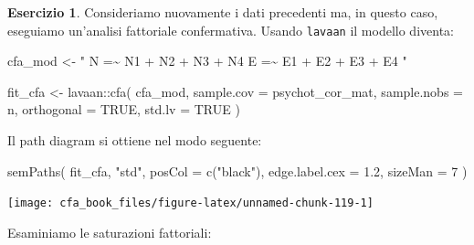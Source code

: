 \documentclass[
  11pt,
]{krantz}
\makeatletter
\newenvironment{Shaded}{\begin{snugshade}}{\end{snugshade}}
\newcommand{\AttributeTok}[1]{\textcolor[rgb]{0.61,0.61,0.61}{#1}}
\newcommand{\ConstantTok}[1]{\textcolor[rgb]{0,0,0}{#1}}
\newcommand{\DecValTok}[1]{\textcolor[rgb]{0.06,0.06,0.06}{#1}}
\newcommand{\FloatTok}[1]{\textcolor[rgb]{0.06,0.06,0.06}{#1}}
\newcommand{\FunctionTok}[1]{\textcolor[rgb]{0,0,0}{#1}}
\newcommand{\NormalTok}[1]{#1}
\newcommand{\OtherTok}[1]{\textcolor[rgb]{0.37,0.37,0.37}{#1}}
\newcommand{\SpecialCharTok}[1]{\textcolor[rgb]{0,0,0}{#1}}
\newcommand{\StringTok}[1]{\textcolor[rgb]{0.5,0.5,0.5}{#1}}
\newenvironment{kframe}{%
\medskip{}
\setlength{\fboxsep}{.8em}
 \def\at@end@of@kframe{}%
 \ifinner\ifhmode%
  \def\at@end@of@kframe{\end{minipage}}%
  \begin{minipage}{\columnwidth}%
 \fi\fi%
 \def\FrameCommand##1{\hskip\@totalleftmargin \hskip-\fboxsep
 \colorbox{shadecolor}{##1}\hskip-\fboxsep
     \hskip-\linewidth \hskip-\@totalleftmargin \hskip\columnwidth}%
 \MakeFramed {\advance\hsize-\width
   \@totalleftmargin\z@ \linewidth\hsize
   \@setminipage}}%
 {\par\unskip\endMakeFramed%
 \at@end@of@kframe}
\renewenvironment{Shaded}{\begin{kframe}}{\end{kframe}}
\theoremstyle{definition}
\theoremstyle{definition}
\theoremstyle{definition}
\newtheorem{exercise}{Esercizio}[chapter]
\theoremstyle{definition}
\theoremstyle{remark}
\makeatother
\begin{document}
\begin{exercise}
Consideriamo nuovamente i dati precedenti ma, in questo caso, eseguiamo un'analisi fattoriale confermativa. Usando \texttt{lavaan} il modello diventa:

\begin{Shaded}
\begin{Highlighting}[]
\NormalTok{cfa\_mod }\OtherTok{\textless{}{-}} \StringTok{"}
\StringTok{  N =\textasciitilde{} N1 + N2 + N3 + N4}
\StringTok{  E =\textasciitilde{} E1 + E2 + E3 + E4}
\StringTok{"}
\end{Highlighting}
\end{Shaded}

\begin{Shaded}
\begin{Highlighting}[]
\NormalTok{fit\_cfa }\OtherTok{\textless{}{-}}\NormalTok{ lavaan}\SpecialCharTok{::}\FunctionTok{cfa}\NormalTok{(}
\NormalTok{  cfa\_mod,}
  \AttributeTok{sample.cov =}\NormalTok{ psychot\_cor\_mat,}
  \AttributeTok{sample.nobs =}\NormalTok{ n,}
  \AttributeTok{orthogonal =} \ConstantTok{TRUE}\NormalTok{,}
  \AttributeTok{std.lv =} \ConstantTok{TRUE}
\NormalTok{)}
\end{Highlighting}
\end{Shaded}

Il path diagram si ottiene nel modo seguente:

\begin{Shaded}
\begin{Highlighting}[]
\FunctionTok{semPaths}\NormalTok{(}
\NormalTok{  fit\_cfa,}
  \StringTok{"std"}\NormalTok{,}
  \AttributeTok{posCol =} \FunctionTok{c}\NormalTok{(}\StringTok{"black"}\NormalTok{),}
  \AttributeTok{edge.label.cex =} \FloatTok{1.2}\NormalTok{,}
  \AttributeTok{sizeMan =} \DecValTok{7}
\NormalTok{)}
\end{Highlighting}
\end{Shaded}

\begin{center}\texttt{[image: cfa\_book\_files/figure-latex/unnamed-chunk-119-1]} \end{center}

Esaminiamo le saturazioni fattoriali:


\end{exercise}
\end{document}
